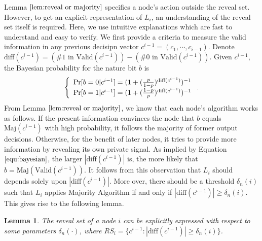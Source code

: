 \documentclass[a4paper,UKenglish]{lipics}
\newtheorem{lem}[thm]{Lemma}
\theoremstyle{definition}
\newcommand{\Maj}{\text{Maj}}
\newcommand{\diff}{\text{diff}}
\begin{document}
Lemma $\ref{lem:reveal or majority}$ specifies a node's action outside the reveal set.
However, to get an explicit representation of $L_i$, an understanding of the reveal set itself is required.
Here, we use intuitive explanations which are fast to understand and easy to verify.
We first provide a criteria to measure the valid information in any previous decisipn vector $c^{i-1} = (c_1, \dotsb, c_{i-1})$.
Denote
$
	\diff(c^{i-1}) 
	= 
	(\text{\# 1 in }\text{Valid}(c^{i-1})) - (\text{\# 0 in }\text{Valid}(c^{i-1})).
$
Given $c^{i-1}$, the Bayesian probability for the nature bit $b$ is 
\begin{equation}
\label{equ:bayesian}
\left\{
\begin{array} {l}
	\Pr[b = 0|c^{i-1}]
	= 
	(1 + ({p\over 1-p})^{\diff(c^{i-1})})^{-1}
\\
	\Pr[b = 1|c^{i-1}] 
	= 
	(1 + ({1-p\over p})^{\diff(c^{i-1})})^{-1} 
\end{array}
\right..
\end{equation}
From Lemma $\ref{lem:reveal or majority}$, we know that each node's algorithm works as follows.
If the present information convinces the node that $b$ equals $\Maj(c^{i-1})$ with high probability, 
	it follows the majority of former output decisions.
Otherwise, for the benefit of later nodes, it tries to provide more information by revealing its own private signal.
As implied by Equation $\eqref{equ:bayesian}$, the larger $|\diff(c^{i-1})|$ is, the more likely that $b = \Maj(\text{Valid}(c^{i-1}))$. 
It follows from this observation that $L_i$ should depends solely upon $|\diff(c^{i-1})|$.
More over, there should be a threshold $\delta_n(i)$ such that $L_i$ applies Majority Algorithm if and only if $|\diff(c^{i-1})| \ge \delta_n(i)$. 
This gives rise to the following lemma.

\begin{lem}
\label{lem:reveal set threshold}
The reveal set of a node $i$ can be explicitly expressed with respect to some parameters $\delta_n(\cdot)$, where
	$RS_i = \{ c^{i-1} :|\diff(c^{i-1})| \ge \delta_n(i) \}$.
\end{lem}
\end{document}
